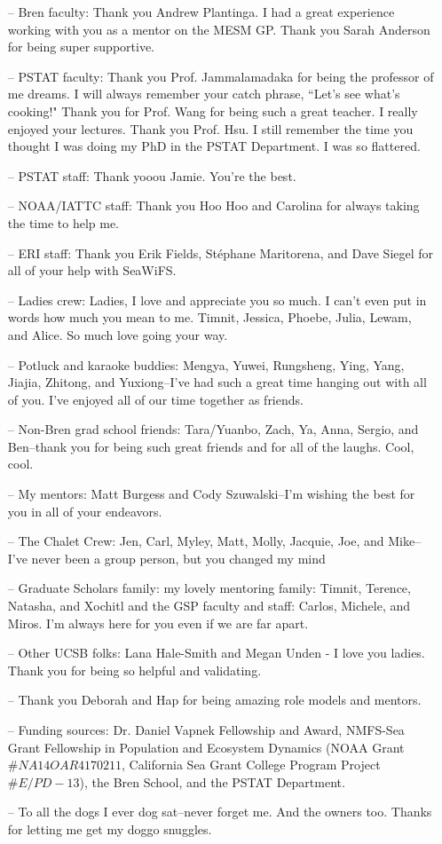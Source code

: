 \begin{acknowledgements}
\begin{itemize}
\item[--] Bren faculty: Thank you Andrew Plantinga. I had a great experience working with you as a mentor on the MESM GP. Thank you Sarah Anderson for being super supportive. 
\item[--] PSTAT faculty: Thank you Prof. Jammalamadaka for being the professor of me dreams. I will always remember your catch phrase, ``Let's see what's cooking!" Thank you for Prof. Wang for being such a great teacher. I really enjoyed your lectures. Thank you Prof. Hsu. I still remember the time you thought I was doing my PhD in the PSTAT Department. I was so flattered. 
\item[--] PSTAT staff: Thank yooou Jamie. You're the best.
\item[--] NOAA/IATTC staff: Thank you Hoo Hoo and Carolina for always taking the time to help me.
\item[--]ERI staff: Thank you Erik Fields, St\'ephane Maritorena, and Dave Siegel for all of your help with SeaWiFS. 
\item[--] Ladies crew: Ladies, I love and appreciate you so much. I can't even put in words how much you mean to me. Timnit, Jessica, Phoebe, Julia, Lewam, and Alice. So much love going your way.
\item[--] Potluck and karaoke buddies: Mengya, Yuwei, Rungsheng, Ying, Yang, Jiajia, Zhitong, and Yuxiong--I've had such a great time hanging out with all of you. I've enjoyed all of our time together as friends. 
\item[--] Non-Bren grad school friends: Tara/Yuanbo, Zach, Ya, Anna, Sergio, and Ben--thank you for being such great friends and for all of the laughs.  Cool, cool.
\item[--] My mentors: Matt Burgess and Cody Szuwalski--I'm wishing the best for you in all of your endeavors.
\item[--] The Chalet Crew: Jen, Carl, Myley, Matt, Molly, Jacquie, Joe, and Mike--I've never been a group person, but you changed my mind
\item[--] Graduate Scholars family: my lovely mentoring family: Timnit, Terence, Natasha, and Xochitl and the GSP faculty and staff: Carlos, Michele, and Miros. I'm always here for you even if we are far apart.
\item[--] Other UCSB folks: Lana Hale-Smith and Megan Unden - I love you ladies. Thank you for being so helpful and validating.
\item[--] Thank you Deborah and Hap for being amazing role models and mentors.
\item[--] Funding sources: Dr. Daniel Vapnek Fellowship and Award, NMFS-Sea Grant Fellowship in Population and Ecosystem Dynamics (NOAA Grant $\#NA14OAR4170211$, California Sea Grant College Program Project $\#E/PD-13$), the Bren School, and the PSTAT Department.
\item[--] To all the dogs I ever dog sat--never forget me. And the owners too. Thanks for letting me get my doggo snuggles.
\end{itemize}
\vspace{-\topsep}

\end{acknowledgements} 